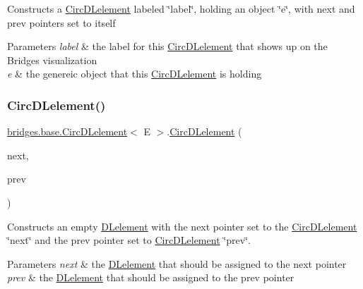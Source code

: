 Constructs a \hyperlink{classbridges_1_1base_1_1_circ_d_lelement}{Circ\+D\+Lelement} labeled \char`\"{}label\char`\"{}, holding an object \char`\"{}e\char`\"{}, with next and prev pointers set to itself


\begin{DoxyParams}{Parameters}
{\em label} & the label for this \hyperlink{classbridges_1_1base_1_1_circ_d_lelement}{Circ\+D\+Lelement} that shows up on the Bridges visualization \\
\hline
{\em e} & the genereic object that this \hyperlink{classbridges_1_1base_1_1_circ_d_lelement}{Circ\+D\+Lelement} is holding \\
\hline
\end{DoxyParams}
\hypertarget{classbridges_1_1base_1_1_circ_d_lelement_a98a471fc3225ed80595e1ffdb377e336}{}\label{classbridges_1_1base_1_1_circ_d_lelement_a98a471fc3225ed80595e1ffdb377e336} 
\subsubsection{\texorpdfstring{Circ\+D\+Lelement()}{CircDLelement()}\hspace{0.1cm}{\footnotesize\ttfamily [3/4]}}
{\footnotesize\ttfamily \hyperlink{classbridges_1_1base_1_1_circ_d_lelement}{bridges.\+base.\+Circ\+D\+Lelement}$<$ E $>$.\hyperlink{classbridges_1_1base_1_1_circ_d_lelement}{Circ\+D\+Lelement} (\begin{DoxyParamCaption}\item[{\hyperlink{classbridges_1_1base_1_1_circ_d_lelement}{Circ\+D\+Lelement}$<$ E $>$}]{next,  }\item[{\hyperlink{classbridges_1_1base_1_1_circ_d_lelement}{Circ\+D\+Lelement}$<$ E $>$}]{prev }\end{DoxyParamCaption})}

Constructs an empty \hyperlink{classbridges_1_1base_1_1_d_lelement}{D\+Lelement} with the next pointer set to the \hyperlink{classbridges_1_1base_1_1_circ_d_lelement}{Circ\+D\+Lelement} \char`\"{}next\char`\"{} and the prev pointer set to \hyperlink{classbridges_1_1base_1_1_circ_d_lelement}{Circ\+D\+Lelement} \char`\"{}prev\char`\"{}.


\begin{DoxyParams}{Parameters}
{\em next} & the \hyperlink{classbridges_1_1base_1_1_d_lelement}{D\+Lelement} that should be assigned to the next pointer \\
\hline
{\em prev} & the \hyperlink{classbridges_1_1base_1_1_d_lelement}{D\+Lelement} that should be assigned to the prev pointer \\
\hline
\end{DoxyParams}
\hypertarget{classbridges_1_1base_1_1_circ_d_lelement_a86e04c826251be9a1a92c4649844e5e7}{}\label{classbridges_1_1base_1_1_circ_d_lelement_a86e04c826251be9a1a92c4649844e5e7} 
